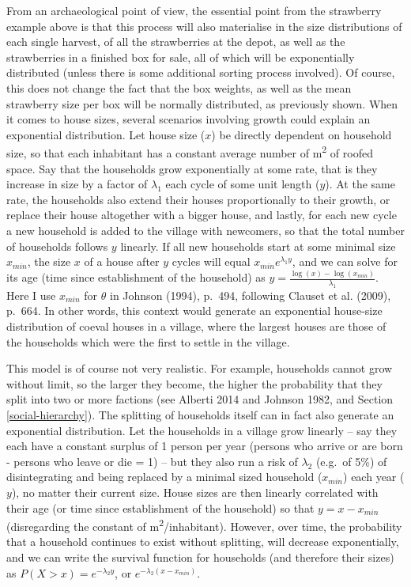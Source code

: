 \documentclass[
  12pt,
]{book}
\begin{document}
From an archaeological point of view, the essential point from the strawberry example above is that this process will also materialise in the size distributions of each single harvest, of all the strawberries at the depot, as well as the strawberries in a finished box for sale, all of which will be exponentially distributed (unless there is some additional sorting process involved). Of course, this does not change the fact that the box weights, as well as the mean strawberry size per box will be normally distributed, as previously shown. When it comes to house sizes, several scenarios involving growth could explain an exponential distribution. Let house size (\(x\)) be directly dependent on household size, so that each inhabitant has a constant average number of m\textsuperscript{2} of roofed space. Say that the households grow exponentially at some rate, that is they increase in size by a factor of \(\lambda_1\) each cycle of some unit length (\(y\)). At the same rate, the households also extend their houses proportionally to their growth, or replace their house altogether with a bigger house, and lastly, for each new cycle a new household is added to the village with newcomers, so that the total number of households follows \(y\) linearly. If all new households start at some minimal size \(x_{min}\), the size \(x\) of a house after \(y\) cycles will equal \(x_{min}e^{\lambda_1 y}\), and we can solve for its age (time since establishment of the household) as \(y = \frac{\log(x)-\log(x_{min})}{\lambda_1}\). Here I use \(x_{min}\) for \(\theta\) in Johnson (1994), p.~494, following Clauset et al. (2009), p.~664. In other words, this context would generate an exponential house-size distribution of coeval houses in a village, where the largest houses are those of the households which were the first to settle in the village.

This model is of course not very realistic. For example, households cannot grow without limit, so the larger they become, the higher the probability that they split into two or more factions (see Alberti 2014 and Johnson 1982, and Section \ref{social-hierarchy}). The splitting of households itself can in fact also generate an exponential distribution. Let the households in a village grow linearly -- say they each have a constant surplus of 1 person per year (persons who arrive or are born - persons who leave or die = 1) -- but they also run a risk of \(\lambda_2\) (e.g.~of 5\%) of disintegrating and being replaced by a minimal sized household (\(x_{min}\)) each year (\(y\)), no matter their current size. House sizes are then linearly correlated with their age (or time since establishment of the household) so that \(y = x - x_{min}\) (disregarding the constant of m\textsuperscript{2}/inhabitant). However, over time, the probability that a household continues to exist without splitting, will decrease exponentially, and we can write the survival function for households (and therefore their sizes) as \(P(X > x) = e^{-\lambda_2 y}\), or \(e^{-\lambda_2 (x-x_{min})}\).
\end{document}
